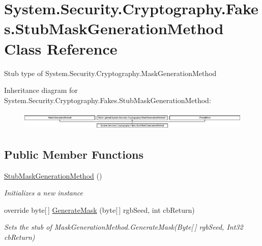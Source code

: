 \hypertarget{class_system_1_1_security_1_1_cryptography_1_1_fakes_1_1_stub_mask_generation_method}{\section{System.\-Security.\-Cryptography.\-Fakes.\-Stub\-Mask\-Generation\-Method Class Reference}
\label{class_system_1_1_security_1_1_cryptography_1_1_fakes_1_1_stub_mask_generation_method}
}


Stub type of System.\-Security.\-Cryptography.\-Mask\-Generation\-Method 


Inheritance diagram for System.\-Security.\-Cryptography.\-Fakes.\-Stub\-Mask\-Generation\-Method\-:\begin{figure}[H]
\begin{center}
\leavevmode
\includegraphics[height=0.886778cm]{class_system_1_1_security_1_1_cryptography_1_1_fakes_1_1_stub_mask_generation_method}
\end{center}
\end{figure}
\subsection*{Public Member Functions}
\begin{DoxyCompactItemize}
\item 
\hyperlink{class_system_1_1_security_1_1_cryptography_1_1_fakes_1_1_stub_mask_generation_method_a3fb23962748c58ae7cecbb377693a41b}{Stub\-Mask\-Generation\-Method} ()
\begin{DoxyCompactList}\small\item\em Initializes a new instance\end{DoxyCompactList}\item 
override byte\mbox{[}$\,$\mbox{]} \hyperlink{class_system_1_1_security_1_1_cryptography_1_1_fakes_1_1_stub_mask_generation_method_a06a5dc8f9fd065116155a7c9b1e8003c}{Generate\-Mask} (byte\mbox{[}$\,$\mbox{]} rgb\-Seed, int cb\-Return)
\begin{DoxyCompactList}\small\item\em Sets the stub of Mask\-Generation\-Method.\-Generate\-Mask(\-Byte\mbox{[}$\,$\mbox{]} rgb\-Seed, Int32 cb\-Return)\end{DoxyCompactList}\end{DoxyCompactItemize}
